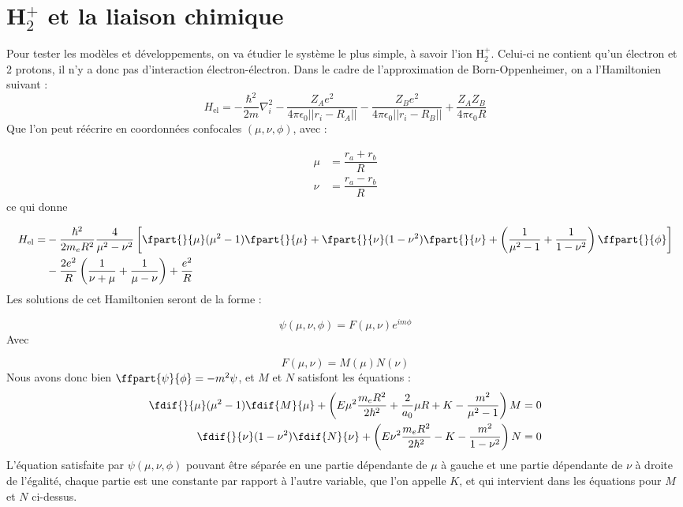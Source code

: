 \section{\textnormal{H}$_2^+$ et la liaison chimique}


Pour tester les modèles et développements, on va étudier le système le plus simple, à savoir l'ion H$_2^+$. Celui-ci ne contient qu'un électron et 2 protons, il n'y a donc pas d'interaction électron-électron. Dans le cadre de l'approximation de Born-Oppenheimer, on a l'Hamiltonien suivant :
\[
    H_\text{el} = -\dfrac{\hbar^2}{2m}\nabla^2_i-\dfrac{Z_Ae^2}{4\pi \epsilon_0||r_i - R_A||}-\dfrac{Z_Be^2}{4\pi \epsilon_0||r_i - R_B||} +\dfrac{Z_AZ_B}{4\pi\epsilon_0R}
\]
Que l'on peut réécrire en coordonnées confocales $(\mu, \nu, \phi)$, avec :

\begin{align*}
    \mu &= \dfrac{r_a + r_b}{R}\\
    \nu &= \dfrac{r_a-r_b}{R}
\end{align*}
ce qui donne

\begin{align*}
    H_\text{el} =& -\dfrac{\hbar^2}{2m_eR^2}\dfrac{4}{\mu^2-\nu^2}\left[\fpart{}{\mu}(\mu^2-1)\fpart{}{\mu}+\fpart{}{\nu}(1-\nu^2)\fpart{}{\nu}+\left(\dfrac{1}{\mu^2-1}+\dfrac{1}{1-\nu^2}\right)\ffpart{}{\phi}\right] \\ 
    &- \dfrac{2e^2}{R}\left(\dfrac{1}{\nu + \mu}+\dfrac{1}{\mu-\nu}\right) + \dfrac{e^2}{R}
\end{align*}
Les solutions de cet Hamiltonien seront de la forme :

\[ \psi(\mu,\nu,\phi) = F(\mu,\nu)e^{im\phi} \]
Avec

\[ F(\mu,\nu) = M(\mu)N(\nu) \]
Nous avons donc bien $\ffpart{\psi}{\phi} = -m^2\psi$, et $M$ et $N$ satisfont les équations :
\begin{align*}
    \fdif{}{\mu}(\mu^2-1)\fdif{M}{\mu} + \left(E\mu^2\dfrac{m_eR^2}{2\hbar^2}+\dfrac{2}{a_0}\mu R+K-\dfrac{m^2}{\mu^2-1}\right)M &= 0\\
    \fdif{}{\nu}(1-\nu^2)\fdif{N}{\nu} + \left(E\nu^2\dfrac{m_eR^2}{2\hbar^2}-K-\dfrac{m^2}{1-\nu^2}\right)N &= 0
\end{align*}
L'équation satisfaite par $\psi(\mu,\nu,\phi)$ pouvant être séparée en une partie dépendante de $\mu$ à gauche et une partie dépendante de $\nu$ à droite de l'égalité, chaque partie est une constante par rapport à l'autre variable, que l'on appelle $K$, et qui intervient dans les équations pour $M$ et $N$ ci-dessus.

